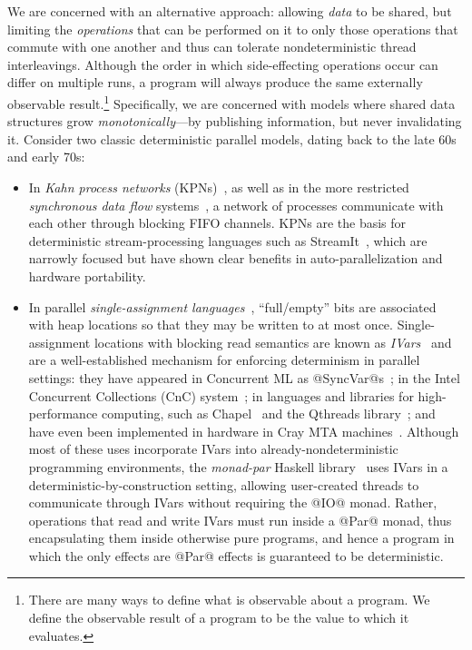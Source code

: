 We are concerned with an alternative approach: allowing {\em data} to
be shared, but limiting the {\em operations} that can be performed on
it to only those operations that commute with one another and thus can
tolerate nondeterministic thread interleavings.  Although the order in
which side-effecting operations occur can differ on multiple runs, a
program will always produce the same externally observable
result.\footnote{There are many ways to define what is observable
  about a program. We define the observable result of a program to be
  the value to which it evaluates.}  Specifically, we are concerned with
models where shared data structures grow {\em monotonically}---by
publishing information, but never invalidating it.  Consider two
classic deterministic parallel models, dating back to the late 60s and
early 70s:
\begin{itemize}
\item In {\em Kahn process networks} (KPNs)~\cite{Kahn-1974}, as well
  as in the more restricted {\em synchronous data flow}
  systems~\cite{Lee-sdn}, a network of processes communicate with each
  other through blocking FIFO channels.  KPNs are the basis for
  deterministic stream-processing languages such as
  StreamIt~\cite{streamit-asplos}, which are narrowly focused but have
  shown clear benefits in auto-parallelization and hardware
  portability.
\item In parallel {\em single-assignment
  languages}~\cite{Tesler-1968}, ``full/empty'' bits are associated
  with heap locations so that they may be written to at most once.
  Single-assignment locations with blocking read semantics are known
  as \emph{IVars}~\cite{IStructures} and are a well-established
  mechanism for enforcing determinism in parallel settings: they have
  appeared in Concurrent ML as @SyncVar@s~\cite{reppy-cml-book}; in
  the Intel Concurrent Collections (CnC) system~\cite{CnC}; in
  languages and libraries for high-performance computing, such as
  Chapel~\cite{chapel} and the Qthreads library~\cite{qthreads}; and
  have even been implemented in hardware in Cray MTA
  machines~\cite{cray-mta}.  Although most of these uses incorporate
  IVars into already-nondeterministic programming environments, the
  \emph{monad-par} Haskell library~\cite{monad-par} uses IVars in a
  deterministic-by-construction setting, allowing user-created threads
  to communicate through IVars without requiring the @IO@ monad.
  Rather, operations that read and write IVars must run inside a @Par@
  monad, thus encapsulating them inside otherwise pure programs, and
  hence a program in which the only effects are @Par@ effects is
  guaranteed to be deterministic.
\end{itemize}

